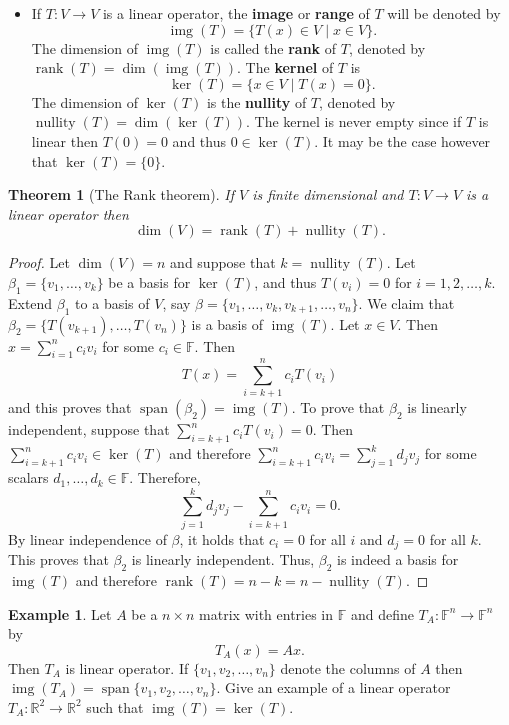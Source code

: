 \documentclass[12pt]{article}
\DeclareMathOperator{\rank}{rank}
\DeclareMathOperator{\spn}{span}
\DeclareMathOperator{\rng}{img}
\DeclareMathOperator{\nullity}{nullity}
\newcommand{\real}{\mathbb{R}}
\newcommand{\tv}{T:V\rightarrow V}
\newtheorem{theorem}{Theorem}[section]
\theoremstyle{definition}
\newtheorem{example}{Example}[section]
\begin{document}
\begin{itemize}
\item If $T:V\rightarrow V$ is a linear operator, the \textbf{image} or \textbf{range} of $T$ will be denoted by
\[
\rng(T) = \{ T(x)\in V\;|\; x\in V\}.
\]
The dimension of $\rng(T)$ is called the \textbf{rank} of $T$, denoted by $\rank(T)=\dim(\rng(T))$.  The \textbf{kernel} of $T$ is
\[
\ker(T) = \{ x\in V \;|\; T(x) = 0\}.
\]
The dimension of $\ker(T)$ is the \textbf{nullity} of $T$, denoted by $\nullity(T)=\dim(\ker(T))$.  The kernel is never empty since if $T$ is linear then $T(0) = 0$ and thus $0\in\ker(T)$.  It may be the case however that $\ker(T)=\{0\}$.
\end{itemize}


\begin{theorem}[The Rank theorem] If $V$ is finite dimensional and $\tv$ is a linear operator then
\[
\dim(V) = \rank(T) + \nullity(T).
\]
\end{theorem}
\begin{proof}
Let $\dim(V)=n$ and suppose that $k=\nullity(T)$.  Let $\beta_1=\{v_1,\ldots,v_k\}$ be a basis for $\ker(T)$, and thus $T(v_i)=0$ for $i=1,2,\ldots,k$.  Extend $\beta_1$ to a basis of $V$, say $\beta=\{v_1,\ldots,v_k,v_{k+1},\ldots,v_n\}$.  We claim that $\beta_2=\{T(v_{k+1}),\ldots,T(v_n)\}$ is a basis of $\rng(T)$.  Let $x\in V$.  Then $x=\sum_{i=1}^n c_i v_i$ for some $c_i\in\mathbb{F}$.  Then
\[
T(x) = \sum_{i=k+1}^n c_i T(v_i)
\]
and this proves that $\spn(\beta_2)=\rng(T)$.  To prove that $\beta_2$ is linearly independent, suppose that $\sum_{i=k+1}^n c_i T(v_i) = 0$.  Then $\sum_{i=k+1}^n c_i v_i \in \ker(T)$ and therefore $\sum_{i=k+1}^n c_i v_i = \sum_{j=1}^{k} d_j v_j$ for some scalars $d_1,\ldots,d_k\in\mathbb{F}$.  Therefore,
\[
\sum_{j=1}^{k} d_j v_j - \sum_{i=k+1}^n c_i v_i  = 0.
\]
By linear independence of $\beta$, it holds that $c_i=0$ for all $i$ and $d_j=0$ for all $k$.  This proves that $\beta_2$ is linearly independent.  Thus, $\beta_2$ is indeed a basis for $\rng(T)$ and therefore $\rank(T) = n - k = n - \nullity(T)$.
\end{proof}

\begin{example}
Let $A$ be a $n\times n$ matrix with entries in $\mathbb{F}$ and define $T_A:\mathbb{F}^n\rightarrow\mathbb{F}^n$ by
\[
T_A(x) = Ax.
\]
Then $T_A$ is linear operator.  If $\{v_1,v_2,\ldots,v_n\}$ denote the columns of $A$ then $\rng(T_A) = \spn\{v_1,v_2,\ldots,v_n\}$.  Give an example of a linear operator $T_A:\real^2\rightarrow\real^2$ such that $\rng(T)=\ker(T)$.
\end{example}
\end{document}
